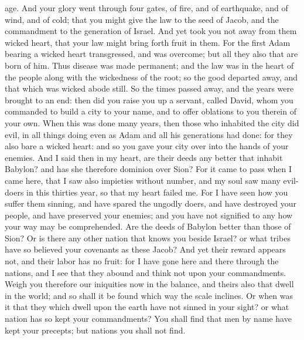 {{} age.
And your glory went through four gates, of fire, and of earthquake, and of wind, and of cold; that you might give the law to the seed of Jacob, and the commandment to the generation of Israel.
And yet took you not away from them
{}
 wicked heart, that your law might bring forth fruit in them.
For the first Adam bearing a
 wicked heart transgressed, and was overcome;
{} but all they also that are born of him.
Thus disease was made permanent; and the law was in the heart of the people along with the
 wickedness of the root; so the good departed away, and that which was
 wicked abode still.
So the times passed away, and the years were brought to an end: then did you raise you up a servant, called David,
whom you commanded to build a city to your name, and to offer oblations to you therein of your own.
When this was done many years, then those who inhabited the city did evil,
in all things doing even as Adam and all his generations had done: for they also bare a
 wicked heart:
and so you gave your city over into the hands of your enemies.
And I said then in my heart, are their deeds any better that inhabit Babylon? and has she therefore dominion over Sion?
For it came to pass when I came here, that I saw also impieties without number, and my soul saw many evil-doers in this thirties year, so that my heart failed me.
For I have seen how you suffer them sinning, and have spared the ungodly doers, and have destroyed your people, and have preserved your enemies; and you have not signified
to any
 how your way may be comprehended. Are the deeds of Babylon better than those of Sion?
Or is there any other nation that knows you beside Israel? or what tribes have so believed your covenants as these
{} Jacob?
And yet their reward appears not, and their labor has no fruit: for I have gone here and there through the nations, and I see that they abound
{} and think not upon your commandments.
Weigh you therefore our iniquities now in the balance, and theirs also that dwell in the world; and so shall it be found which way the scale inclines.
Or when was it that they which dwell upon the earth have not sinned in your sight? or what nation has so kept your commandments?
You shall find that men
{} by name have kept your precepts; but nations you shall not find.

}
